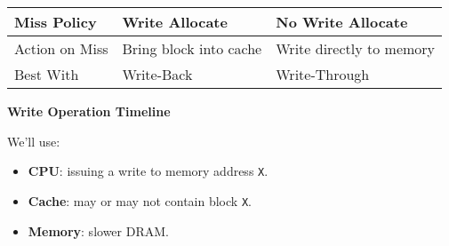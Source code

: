 \begin{table}[!htp]
    \centering
    \begin{tabular}{@{} l l l @{}}
        \toprule
        Miss Policy & Write Allocate & No Write Allocate \\
        \midrule
        Action on Miss   & Bring block into cache   & Write directly to memory  \\ [.3em]
        Best With        & Write-Back               & Write-Through             \\
        \bottomrule
    \end{tabular}
\end{table}

\newpage

\begin{flushleft}
    \textcolor{Green3}{ \textbf{Write Operation Timeline}}
\end{flushleft}
We'll use:
\begin{itemize}
    \item \textbf{CPU}: issuing a write to memory address \texttt{X}.
    \item \textbf{Cache}: may or may not contain block \texttt{X}.
    \item \textbf{Memory}: slower DRAM.
\end{itemize}
